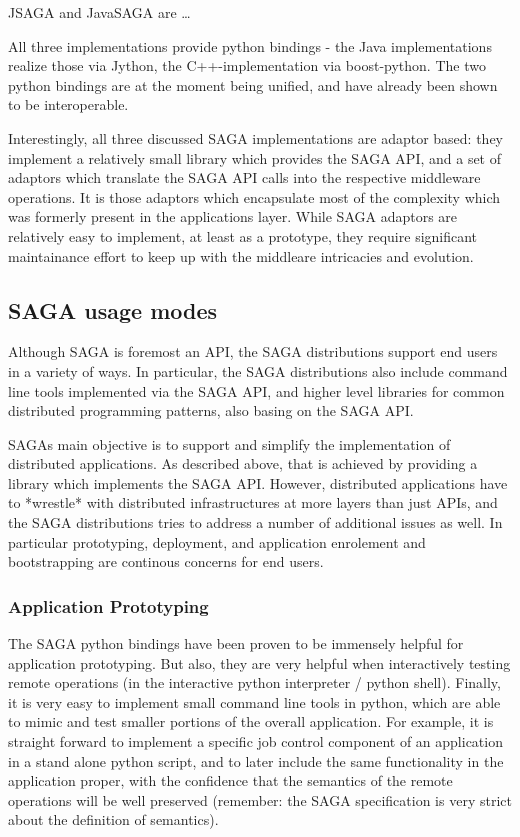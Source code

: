 \documentclass[3p,twocolumn]{article}
\begin{document}
  JSAGA and JavaSAGA are …

  All three implementations provide python bindings - the Java
  implementations realize those via Jython, the C++-implementation via
  boost-python.  The two python bindings are at the moment being
  unified, and have already been shown to be interoperable.

  Interestingly, all three discussed SAGA implementations are adaptor
  based: they implement a relatively small library which provides the
  SAGA API, and a set of adaptors which translate the SAGA API calls
  into the respective middleware operations.  It is those adaptors
  which encapsulate most of the complexity which was formerly present
  in the applications layer.  While SAGA adaptors are relatively easy
  to implement, at least as a prototype, they require significant
  maintainance effort to keep up with the middleare intricacies and
  evolution.


 \subsection{SAGA usage modes}

  Although SAGA is foremost an API, the SAGA distributions support end
  users in a variety of ways.  In particular, the SAGA distributions
  also include command line tools implemented via the SAGA API, and
  higher level libraries for common distributed programming patterns,
  also basing on the SAGA API. 

  SAGAs main objective is to support and simplify the implementation
  of distributed applications.  As described above, that is achieved
  by providing a library which implements the SAGA API.  However,
  distributed applications have to *wrestle* with distributed
  infrastructures at more layers than just APIs, and the SAGA
  distributions tries to address a number of additional issues as
  well. In particular prototyping, deployment, and application
  enrolement and bootstrapping are continous concerns for end users.

  \subsubsection*{Application Prototyping}

   The SAGA python bindings have been proven to be immensely helpful
   for application prototyping.  But also, they are very helpful when
   interactively testing remote operations (in the interactive python
   interpreter / python shell).  Finally, it is very easy to implement
   small command line tools in python, which are able to mimic and
   test smaller portions of the overall application.  For example, it
   is straight forward to implement a specific job control component
   of an application in a stand alone python script, and to later
   include the same functionality in the application proper, with the
   confidence that the semantics of the remote operations will be well
   preserved (remember: the SAGA specification is very strict about
   the definition of semantics).
\end{document}
